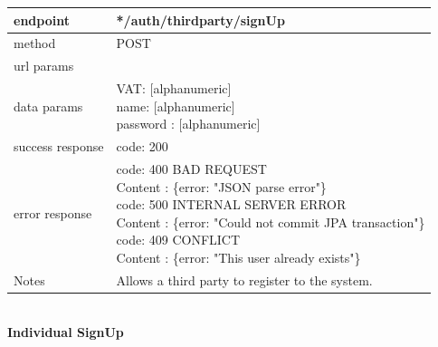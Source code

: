 \begin{legal}
\begin{legal}
\begin{itemize}
							\begin{tabularx}{\linewidth}{| l| l }
								\hline
								endpoint & */auth/thirdparty/signUp \\
								\hline
								method & POST \\
								\hline
								url params & \\
								\hline
								data params &
								\parbox{0.7\textwidth}{
									\bigskip
									VAT: [alphanumeric]\\
									name: [alphanumeric]\\
									password : [alphanumeric]
									\bigskip
								} \\
								\hline
								success response &
								\parbox{0.7\textwidth}{
									\bigskip
									code: 200\\
								} \\
								\hline
								error response &
								\parbox{0.7\textwidth}{
									\bigskip
									code: 400 BAD REQUEST \\
									Content : \{error: "JSON parse error"\}\\
									code: 500 INTERNAL SERVER ERROR \\
									Content : \{error: "Could not commit JPA transaction"\}\\
									code: 409 CONFLICT \\
									Content : \{error: "This user already exists"\}
									\bigskip
								} \\
								\hline
								Notes & 
								\parbox{0.7\textwidth}{
									\bigskip Allows a third party to register to the system.
								\bigskip}  \\
								\hline
							\end{tabularx}\\
							
						\newpage
						\textbf{Individual SignUp} \\
			

\end{itemize}
\end{legal}
\end{legal}
